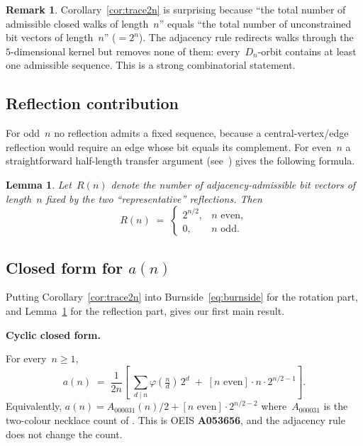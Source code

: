 \documentclass[11pt,a4paper]{article}
\theoremstyle{definition}
\newtheorem{remark}[definition]{Remark}
\theoremstyle{plain}
\newtheorem{lemma}[definition]{Lemma}
\newenvironment{result}[1][Main Result]{%
  \par\medskip
  \begin{lrbox}{\resultbox}%
  \begin{minipage}{\dimexpr\linewidth-1cm}%
  {\color{navy}\bfseries\large #1.}\par\medskip
}{%
  \end{minipage}%
  \end{lrbox}%
  \noindent
  \setlength{\fboxsep}{8pt}\setlength{\fboxrule}{1pt}%
  \fcolorbox{navy}{softgrey}{\usebox{\resultbox}}%
  \par\medskip
}
\newcommand{\Dn}{D_{n}}
\begin{document}
\begin{remark}
Corollary~\ref{cor:trace2n} is surprising because ``the total number of
admissible closed walks of length~$n$'' equals ``the total number of
unconstrained bit vectors of length~$n$'' ($= 2^n$).  The adjacency rule
redirects walks through the~$5$-dimensional kernel but removes none of
them: every~$\Dn$-orbit contains at least one admissible sequence.  This
is a strong combinatorial statement.
\end{remark}

\subsection{Reflection contribution}

For odd~$n$ no reflection admits a fixed sequence, because a
central-vertex/edge reflection would require an edge whose bit equals its
complement.  For even~$n$ a straightforward half-length transfer argument
(see~\cite[Sec. IV]{cyclic-src}) gives the following formula.

\begin{lemma}\label{lem:refl}
Let~$R(n)$ denote the number of adjacency-admissible bit vectors of
length~$n$ fixed by the two ``representative'' reflections.  Then
\[
R(n) \;=\;
\begin{cases}
2^{n/2}, & n \text{ even},\\
0,       & n \text{ odd}.
\end{cases}
\]
\end{lemma}

\subsection{Closed form for $a(n)$}

Putting Corollary~\ref{cor:trace2n} into Burnside~\eqref{eq:burnside} for
the rotation part, and Lemma~\ref{lem:refl} for the reflection part, gives
our first main result.

\begin{result}[Cyclic closed form]
\label{thm:cyclic}
For every~$n\ge 1$,
\begin{equation}\label{eq:cyclic-closed}
\boxed{\;
a(n) \;=\; \frac{1}{2n}\!\left[\;\sum_{d\mid n} \varphi\!\left(\tfrac{n}{d}\right)\,2^d
    \;+\; [n \text{ even}]\cdot n\cdot 2^{n/2 - 1}\right].
\;}
\end{equation}
Equivalently, $a(n) = A_{000031}(n)/2 + [n\text{ even}]\cdot 2^{n/2-2}$
where~$A_{000031}$ is the two-colour necklace count of \cite{oeisA000031}.
This is OEIS \textbf{A053656}, and the adjacency rule does not change
the count.
\end{result}
\end{document}
